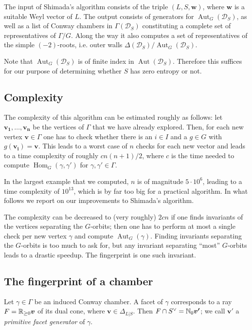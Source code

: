 \documentclass[11pt,letterpaper]{amsart}
\newcommand{\vect}[1]{\boldsymbol{#1}}
\DeclareMathOperator{\Hom}{Hom}
\DeclareMathOperator{\Aut}{Aut}
\begin{document}
The input of Shimada's algorithm consists of the triple $(L,S,\vect{w})$, where $\vect{w}$ is a suitable Weyl vector of $L$.
The output consists of generators for $\Aut_G(\mathcal{D}_S)$, as well as a list of Conway chambers in $\Gamma(\mathcal{D}_S)$ constituting a complete set of representatives of $\Gamma/G$.
Along the way it also computes a set of representatives of the simple $(-2)$-roots, i.e. outer walls $\Delta(\mathcal{D}_S) / \Aut_G(\mathcal{D}_S)$.

Note that $\Aut_G(\mathcal{D}_S)$ is of finite index in $\Aut(\mathcal{D}_S)$. Therefore this suffices for our purpose of determining whether $S$ has zero entropy or not. 


\subsection{Complexity}
The complexity of this algorithm can be estimated roughly as follows:
let $\vect{v_1},\dots, \vect{v_n}$ be the vertices of $\Gamma$ that we have already explored.
Then, for each new vertex $\vect{v} \in \Gamma$ one has to check whether there is an $i \in I$ and a $g\in G$ with $g(\vect{v_i})=\vect{v}$.
This leads to a worst case of $n$ checks for each new vector and leads to a time complexity of roughly $c n(n+1)/2$, where $c$ is the time needed to compute $\Hom_G(\gamma, \gamma')$ for $\gamma, \gamma' \in \Gamma$. 

In the largest example that we computed, $n$ is of magnitude $5\cdot 10^6$, leading to a time complexity of $10^{13}$, which is by far too big for a practical algorithm.
In what follows we report on our improvements to Shimada's algorithm.

The complexity can be decreased to (very roughly) $2c n$ if one finds invariants of the vertices separating the $G$-orbits; then one has to perform at most a single check per new vertex $\gamma$ and compute $\Aut_G(\gamma)$. 
Finding invariants separating the $G$-orbits is too much to ask for, but any invariant separating ``most'' $G$-orbits leads to a drastic speedup. The fingerprint is one such invariant. 

\subsection{The fingerprint of a chamber}
Let $\gamma \in \Gamma$ be an induced Conway chamber. A facet of $\gamma$ corresponds to a ray $F = \RR_{\geq 0} \vect{v}$ of its dual cone, where $\vect{v} \in \Delta_{L|S}$. Then $F \cap S^\vee = \NN_0 \vect{v'}$; we call $\vect{v'}$ a \emph{primitive facet generator} of $\gamma$. 
\end{document}
